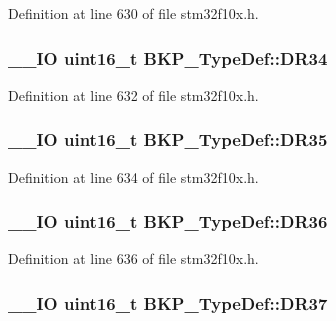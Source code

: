 Definition at line 630 of file stm32f10x.\-h.

\hypertarget{struct_b_k_p___type_def_a0e6152e3a9ac3f0086df42cebb80832f}{
\subsubsection[{D\-R34}]{\setlength{\rightskip}{0pt plus 5cm}\-\_\-\-\_\-\-I\-O {\bf uint16\-\_\-t} B\-K\-P\-\_\-\-Type\-Def\-::\-D\-R34}}\label{struct_b_k_p___type_def_a0e6152e3a9ac3f0086df42cebb80832f}


Definition at line 632 of file stm32f10x.\-h.

\hypertarget{struct_b_k_p___type_def_a085a88cda3752b0f2248f40c3b552905}{
\subsubsection[{D\-R35}]{\setlength{\rightskip}{0pt plus 5cm}\-\_\-\-\_\-\-I\-O {\bf uint16\-\_\-t} B\-K\-P\-\_\-\-Type\-Def\-::\-D\-R35}}\label{struct_b_k_p___type_def_a085a88cda3752b0f2248f40c3b552905}


Definition at line 634 of file stm32f10x.\-h.

\hypertarget{struct_b_k_p___type_def_a239295664cc073b3f3da282fa73dc3c6}{
\subsubsection[{D\-R36}]{\setlength{\rightskip}{0pt plus 5cm}\-\_\-\-\_\-\-I\-O {\bf uint16\-\_\-t} B\-K\-P\-\_\-\-Type\-Def\-::\-D\-R36}}\label{struct_b_k_p___type_def_a239295664cc073b3f3da282fa73dc3c6}


Definition at line 636 of file stm32f10x.\-h.

\hypertarget{struct_b_k_p___type_def_aa1f71e6639cfcc903c534596672fb007}{
\subsubsection[{D\-R37}]{\setlength{\rightskip}{0pt plus 5cm}\-\_\-\-\_\-\-I\-O {\bf uint16\-\_\-t} B\-K\-P\-\_\-\-Type\-Def\-::\-D\-R37}}\label{struct_b_k_p___type_def_aa1f71e6639cfcc903c534596672fb007}


